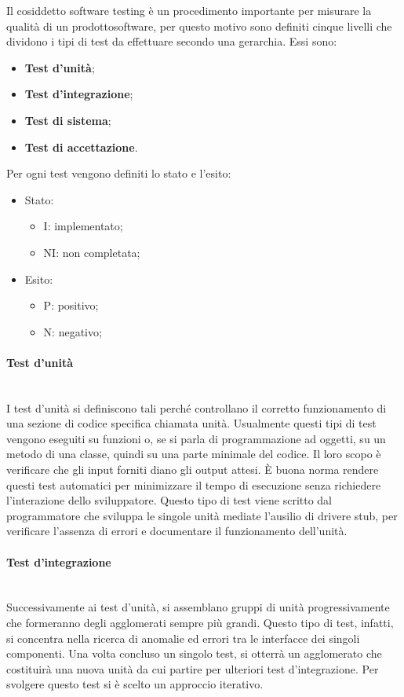 Il cosiddetto software testing è un procedimento importante per misurare la qualità di un prodotto\glosp software, per questo motivo sono definiti cinque livelli che dividono i tipi di test da effettuare secondo una gerarchia. Essi sono: 
\begin{itemize}
	\item \textbf{Test d'unità};
	\item \textbf{Test d'integrazione};
	\item \textbf{Test di sistema};
	\item \textbf{Test di accettazione}.
\end{itemize}
Per ogni test vengono definiti lo stato e l'esito:
\begin{itemize}
	\item Stato:
	\begin{itemize}
		\item I: implementato;
		\item NI: non completata;
	\end{itemize}
	\item Esito:
	\begin{itemize}
		\item P: positivo;
		\item N: negativo;
	\end{itemize}
\end{itemize}

\paragraph*{Test d'unità} \mbox{}\\ [1mm]
I test d'unità si definiscono tali perché controllano il corretto funzionamento di una sezione di codice specifica chiamata unità. Usualmente questi tipi di test vengono eseguiti su funzioni o, se si parla di programmazione ad oggetti, su un metodo di una classe, quindi su una parte minimale del codice. Il loro scopo è verificare che gli input forniti diano gli output attesi. È buona norma rendere questi test automatici per minimizzare il tempo di esecuzione senza richiedere l'interazione dello sviluppatore. Questo tipo di test viene scritto dal programmatore che sviluppa le singole unità mediate l'ausilio di driver\glosp e stub\glo, per verificare l'assenza di errori e documentare il funzionamento dell'unità.

\paragraph*{Test d'integrazione} \mbox{}\\ [1mm]
Successivamente ai test d'unità, si assemblano gruppi di unità progressivamente che formeranno degli agglomerati sempre più grandi. Questo tipo di test, infatti, si concentra nella ricerca di anomalie ed errori tra le interfacce dei singoli componenti. Una volta concluso un singolo test, si otterrà un agglomerato che costituirà una nuova unità da cui partire per ulteriori test d'integrazione. Per svolgere questo test si è scelto un approccio iterativo.

